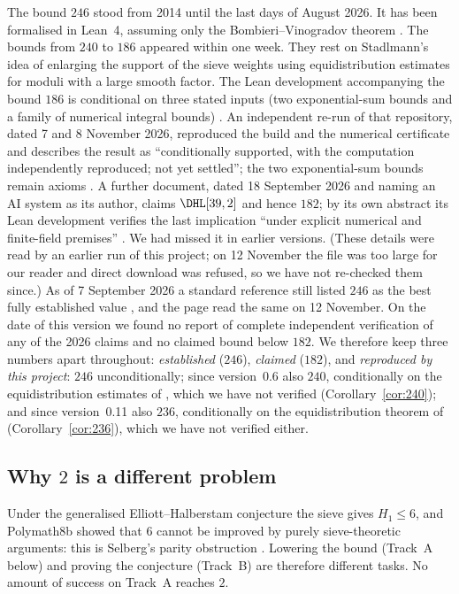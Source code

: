 The bound $246$ stood from 2014 until the last days of August 2026. It has been
formalised in Lean~4, assuming only the Bombieri--Vinogradov theorem
\cite{Axiom26}. The bounds from $240$ to $186$ appeared within one week.
They rest on Stadlmann's idea of enlarging the support of the sieve weights
using equidistribution estimates for moduli with a large smooth factor. The
Lean development accompanying the bound $186$ is conditional on three stated
inputs (two exponential-sum bounds and a family of numerical integral bounds)
\cite{OAI26}. An independent re-run of that repository, dated 7 and 8 November
2026, reproduced the build and the numerical certificate and describes the
result as ``conditionally supported, with the computation independently
reproduced; not yet settled''; the two exponential-sum bounds remain axioms
\cite{NM26}. A further document, dated 18 September 2026 and naming an AI
system as its author, claims $\DHL[39,2]$ and hence $182$; by its own abstract
its Lean development verifies the last implication ``under explicit numerical
and finite-field premises'' \cite{Sha26}. We had missed it in earlier
versions. (These details were read by an earlier run of this project; on
12 November the file was too large for our reader and direct download was
refused, so we have not re-checked them since.) As of 7 September 2026 a standard reference still listed $246$ as
the best fully established value \cite{MW}, and the page read the same on 12
November. On the date of this version we found no report of complete
independent verification of any of the 2026 claims and no claimed bound below
$182$. We therefore keep three numbers apart throughout: \emph{established}
($246$), \emph{claimed} ($182$), and \emph{reproduced by this project}:
$246$ unconditionally; since version~0.6 also $240$, conditionally on
the equidistribution estimates of \cite{Sta26}, which we have not verified
(Corollary~\ref{cor:240}); and since version~0.11 also $236$, conditionally
on the equidistribution theorem of \cite{SY26} (Corollary~\ref{cor:236}),
which we have not verified either.

\subsection*{Why \texorpdfstring{$2$}{2} is a different problem}
Under the generalised Elliott--Halberstam conjecture the sieve gives $H_1\le6$,
and Polymath8b showed that $6$ cannot be improved by purely sieve-theoretic
arguments: this is Selberg's parity obstruction \cite{Pol14b}. Lowering the
bound (Track~A below) and proving the conjecture (Track~B) are therefore
different tasks. No amount of success on Track~A reaches $2$.

